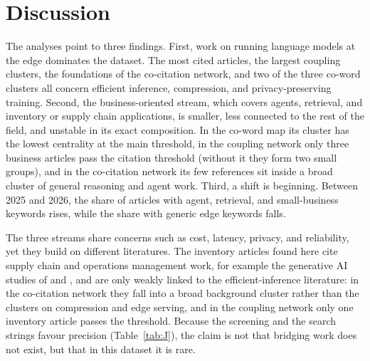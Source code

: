 \section{Discussion}

The analyses point to three findings. First, work on running language models at the edge dominates the dataset. The most cited articles, the largest coupling clusters, the foundations of the co-citation network, and two of the three co-word clusters all concern efficient inference, compression, and privacy-preserving training. Second, the business-oriented stream, which covers agents, retrieval, and inventory or supply chain applications, is smaller, less connected to the rest of the field, and unstable in its exact composition. In the co-word map its cluster has the lowest centrality at the main threshold, in the coupling network only three business articles pass the citation threshold (without it they form two small groups), and in the co-citation network its few references sit inside a broad cluster of general reasoning and agent work. Third, a shift is beginning. Between 2025 and 2026, the share of articles with agent, retrieval, and small-business keywords rises, while the share with generic edge keywords falls.

The three streams share concerns such as cost, latency, privacy, and reliability, yet they build on different literatures. The inventory articles found here cite supply chain and operations management work, for example the generative AI studies of \textcite{jackson2024} and \textcite{wamba2023}, and are only weakly linked to the efficient-inference literature: in the co-citation network they fall into a broad background cluster rather than the clusters on compression and edge serving, and in the coupling network only one inventory article passes the threshold. Because the screening and the search strings favour precision (Table~\ref{tab:J}), the claim is not that bridging work does not exist, but that in this dataset it is rare.

